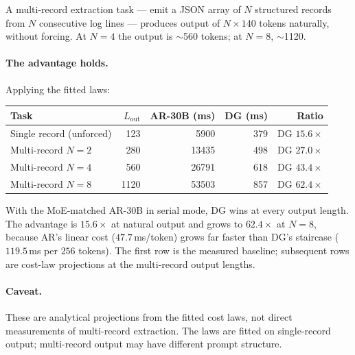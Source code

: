 A multi-record extraction task --- emit a JSON array of $N$ structured
records from $N$ consecutive log lines --- produces output of
$N \times 140$ tokens naturally, without forcing. At $N{=}4$ the output
is $\sim$560 tokens; at $N{=}8$, $\sim$1120.

\paragraph{The advantage holds.}

Applying the fitted laws:

\begin{center}
\begin{tabular}{@{}lrrrr@{}}
\toprule
Task & $L_{\mathrm{out}}$ & AR-30B (ms) & DG (ms) & Ratio \\
\midrule
Single record (unforced) & 123 & 5900 & 379 & DG $15.6\times$ \\
Multi-record $N{=}2$ & 280 & 13435 & 498 & DG $27.0\times$ \\
Multi-record $N{=}4$ & 560 & 26791 & 618 & DG $43.4\times$ \\
Multi-record $N{=}8$ & 1120 & 53503 & 857 & DG $62.4\times$ \\
\bottomrule
\end{tabular}
\end{center}

With the MoE-matched AR-30B in serial mode, DG wins at every output
length. The advantage is $15.6\times$ at natural output and grows to
$62.4\times$ at $N{=}8$, because AR's linear cost ($47.7$\,ms/token)
grows far faster than DG's staircase ($119.5$\,ms per $256$ tokens).
The first row is the measured baseline; subsequent rows are cost-law
projections at the multi-record output lengths.

\paragraph{Caveat.}

These are analytical projections from the fitted cost laws, not direct
measurements of multi-record extraction. The laws are fitted on
single-record output; multi-record output may have different prompt
structure.
